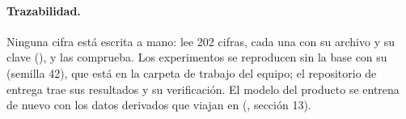 \paragraph{Trazabilidad.} Ninguna cifra está escrita a mano:  lee 202
cifras, cada una con su archivo y su clave (), y
 las comprueba. Los experimentos se reproducen sin la base con su
 (semilla 42), que está en la carpeta de trabajo del equipo; el repositorio de entrega trae sus
resultados y su verificación. El modelo del producto se entrena de nuevo con los datos derivados que viajan en
 (, sección 13).
